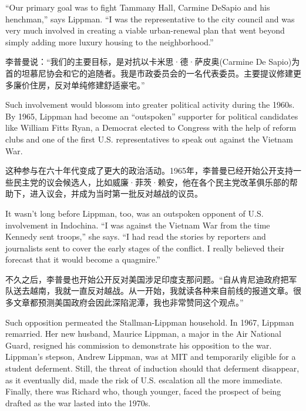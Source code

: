 \ifdefined\eng
``Our primary goal was to fight Tammany Hall, Carmine DeSapio and his henchman,'' says Lippman. ``I was the representative to the city council and was very much involved in creating a viable urban-renewal plan that went beyond simply adding more luxury housing to the neighborhood.''
\fi

\ifdefined\chs
李普曼说：``我们的主要目标，是对抗以卡米思·德·萨皮奥(Carmine De Sapio)为首的坦慕尼协会和它的追随者。我是市政委员会的一名代表委员。主要提议修建更多廉价住房，反对单纯修建舒适豪宅。''
\fi

\ifdefined\eng
Such involvement would blossom into greater political activity during the 1960s. By 1965, Lippman had become an ``outspoken'' supporter for political candidates like William Fitts Ryan, a Democrat elected to Congress with the help of reform clubs and one of the first U.S. representatives to speak out against the Vietnam War.
\fi

\ifdefined\chs
这种参与在六十年代变成了更大的政治活动。1965年，李普曼已经开始公开支持一些民主党的议会候选人，比如威廉·菲茨·赖安，他在各个民主党改革俱乐部的帮助下，进入议会，并成为当时第一批反对越战的议员。
\fi

\ifdefined\eng
It wasn't long before Lippman, too, was an outspoken opponent of U.S. involvement in Indochina. ``I was against the Vietnam War from the time Kennedy sent troops,'' she says. ``I had read the stories by reporters and journalists sent to cover the early stages of the conflict. I really believed their forecast that it would become a quagmire.''
\fi

\ifdefined\chs
不久之后，李普曼也开始公开反对美国涉足印度支那问题。``自从肯尼迪政府把军队送去越南，我就一直反对越战。从一开始，我就读各种来自前线的报道文章。很多文章都预测美国政府会因此深陷泥潭，我也非常赞同这个观点。''
\fi

\ifdefined\eng
Such opposition permeated the Stallman-Lippman household. In 1967, Lippman remarried. Her new husband, Maurice Lippman, a major in the Air National Guard, resigned his commission to demonstrate his opposition to the war. Lippman's stepson, Andrew Lippman, was at MIT and temporarily eligible for a student deferment. Still, the threat of induction should that deferment disappear, as it eventually did, made the risk of U.S. escalation all the more immediate. Finally, there was Richard who, though younger, faced the prospect of being drafted as the war lasted into the 1970s.
\fi

